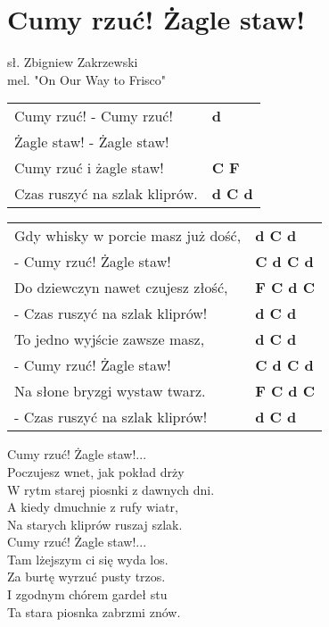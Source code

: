 \section{Cumy rzuć! Żagle staw!}

sł. Zbigniew Zakrzewski\\
mel. "On Our Way to Frisco"\\

\vspace{2em}
\begin{tabular}{@{}p{7cm}@{}l@{}}
Cumy rzuć! - Cumy rzuć! & \bfseries d\\
Żagle staw! - Żagle staw! & \\
Cumy rzuć i żagle staw! & \bfseries C F\\
Czas ruszyć na szlak kliprów. & \bfseries d C d\\
\end{tabular}

\begin{tabular}{@{}p{7cm}@{}l@{}}
Gdy whisky w porcie masz już dość, & \bfseries d C d\\
- Cumy rzuć! Żagle staw! & \bfseries C d C d\\
Do dziewczyn nawet czujesz złość, & \bfseries F C d C\\
- Czas ruszyć na szlak kliprów! & \bfseries d C d\\
To jedno wyjście zawsze masz, & \bfseries d C d\\
- Cumy rzuć! Żagle staw! & \bfseries C d C d\\
Na słone bryzgi wystaw twarz. & \bfseries F C d C\\
- Czas ruszyć na szlak kliprów! & \bfseries d C d\\
\end{tabular}

\vspace{1em}
Cumy rzuć! Żagle staw!... \\

Poczujesz wnet, jak pokład drży \\
W rytm starej piosnki z dawnych dni. \\
A kiedy dmuchnie z rufy wiatr, \\
Na starych kliprów ruszaj szlak. \\

Cumy rzuć! Żagle staw!... \\

Tam lżejszym ci się wyda los. \\
Za burtę wyrzuć pusty trzos. \\
I zgodnym chórem gardeł stu \\
Ta stara piosnka zabrzmi znów. 